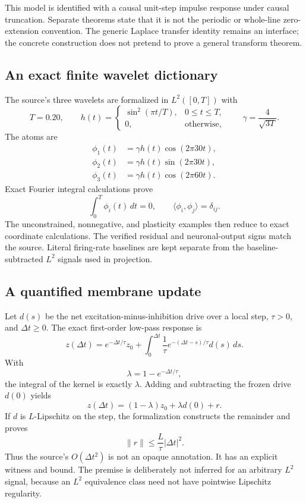 \documentclass[11pt,a4paper]{article}
\begin{document}
This model is identified with a causal unit-step impulse response under
causal truncation. Separate theorems state that it is not the periodic or
whole-line zero-extension convention. The generic Laplace transfer identity
remains an interface; the concrete construction does not pretend to prove a
general transform theorem.

\subsection{An exact finite wavelet dictionary}

The source's three wavelets are formalized in
\(L^2([0,T])\) with
\[
  T=0.20,\qquad
  h(t)=
  \begin{cases}
    \sin^2(\pi t/T),&0\leq t\leq T,\\
    0,&\text{otherwise},
  \end{cases}
  \qquad
  \gamma=\frac{4}{\sqrt{3T}}.
\]
The atoms are
\[
\begin{aligned}
  \phi_1(t)&=\gamma h(t)\cos(2\pi 30t),\\
  \phi_2(t)&=\gamma h(t)\sin(2\pi 30t),\\
  \phi_3(t)&=\gamma h(t)\cos(2\pi 60t).
\end{aligned}
\]
Exact Fourier integral calculations prove
\[
  \int_0^T\phi_i(t)\,dt=0,
  \qquad
  \langle\phi_i,\phi_j\rangle=\delta_{ij}.
\]
The unconstrained, nonnegative, and plasticity examples then reduce to exact
coordinate calculations. The verified residual and neuronal-output signs
match the source. Literal firing-rate baselines are kept separate from the
baseline-subtracted \(L^2\) signals used in projection.

\subsection{A quantified membrane update}

Let \(d(s)\) be the net excitation-minus-inhibition drive over a local step,
\(\tau>0\), and \(\Delta t\geq0\). The exact first-order low-pass response is
\[
  z(\Delta t)=e^{-\Delta t/\tau}z_0+
  \int_0^{\Delta t}
    \frac{1}{\tau}e^{-(\Delta t-s)/\tau}d(s)\,ds.
\]
With
\[
  \lambda=1-e^{-\Delta t/\tau},
\]
the integral of the kernel is exactly \(\lambda\). Adding and subtracting the
frozen drive \(d(0)\) yields
\[
  z(\Delta t)
  =(1-\lambda)z_0+\lambda d(0)+r.
\]
If \(d\) is \(L\)-Lipschitz on the step, the formalization constructs the
remainder and proves
\[
  \|r\|\leq\frac{L}{\tau}|\Delta t|^2.
\]
Thus the source's \(O(\Delta t^2)\) is not an opaque annotation. It has an
explicit witness and bound. The premise is deliberately not inferred for an
arbitrary \(L^2\) signal, because an \(L^2\) equivalence class need not have
pointwise Lipschitz regularity.
\end{document}

